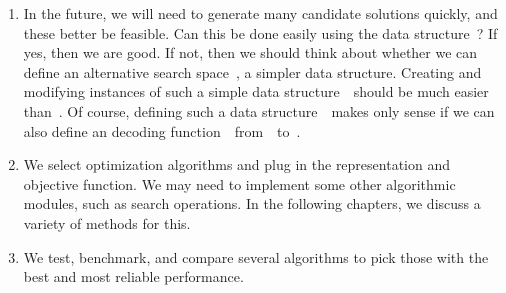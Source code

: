 \begin{enumerate}%
%
\item In the future, we will need to generate many candidate solutions quickly, and these better be feasible.
Can this be done easily using the data structure~\solutionSpace?
If yes, then we are good.
If not, then we should think about whether we can define an alternative search space~\searchSpace, a simpler data structure.
Creating and modifying instances of such a simple data structure~\searchSpace\ should be much easier than~\solutionSpace.
Of course, defining such a data structure~\searchSpace\ makes only sense if we can also define an decoding function~\decode\ from~\searchSpace\ to~\solutionSpace.%
%
\item We select optimization algorithms and plug in the representation and objective function.
We may need to implement some other algorithmic modules, such as search operations.
In the following chapters, we discuss a variety of methods for this.%
%
\item We test, benchmark, and compare several algorithms to pick those with the best and most reliable performance.%
%
\end{enumerate}%
%
\endhsection%
%

